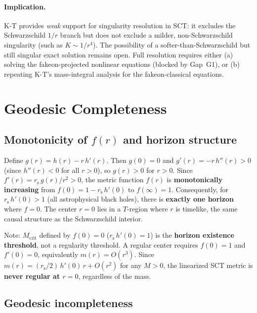 \documentclass[11pt,a4paper]{article}
\theoremstyle{definition}
\theoremstyle{remark}
\newcommand{\rs}{r_{\mathrm{s}}}
\begin{document}
\paragraph{Implication.}
K-T provides \emph{weak} support for singularity resolution in SCT: it excludes the
Schwarzschild $1/r$ branch but does not exclude a milder, non-Schwarzschild singularity
(such as $K \sim 1/r^4$).  The possibility of a softer-than-Schwarzschild but still
singular exact solution remains open.  Full resolution requires either (a) solving the
fakeon-projected nonlinear equations (blocked by Gap~G1), or (b) repeating K-T's
mass-integral analysis for the fakeon-classical equations.

\section{Geodesic Completeness}

\subsection{Monotonicity of $f(r)$ and horizon structure}

Define $g(r) = h(r) - r\,h'(r)$. Then $g(0) = 0$ and $g'(r) = -r\,h''(r) > 0$
(since $h''(r) < 0$ for all $r > 0$), so $g(r) > 0$ for $r > 0$. Since
$f'(r) = \rs\, g(r)/r^2 > 0$, the metric function $f(r)$ is \textbf{monotonically
increasing} from $f(0) = 1 - \rs\,h'(0)$ to $f(\infty) = 1$. Consequently,
for $\rs\,h'(0) > 1$ (all astrophysical black holes), there is \textbf{exactly one
horizon} where $f = 0$. The center $r = 0$ lies in a $T$-region where $r$ is
timelike, the same causal structure as the Schwarzschild interior.

Note: $M_{\mathrm{crit}}$ defined by $f(0) = 0$ ($\rs\,h'(0) = 1$) is the
\textbf{horizon existence threshold}, not a regularity threshold. A regular
center requires $f(0) = 1$ and $f'(0) = 0$, equivalently $m(r) = O(r^3)$.
Since $m(r) = (\rs/2)\,h'(0)\,r + O(r^2)$ for any $M > 0$, the linearized
SCT metric is \textbf{never regular at $r = 0$}, regardless of the mass.

\subsection{Geodesic incompleteness}
\end{document}
